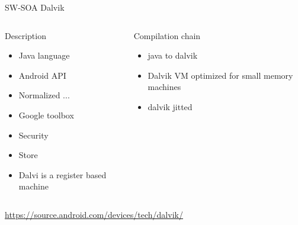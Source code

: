 %
\begin{Frame}{SW-SOA Dalvik}
  \begin{columns}[t]
    \begin{column}{5cm} %
      \begin{block}{Description}
        \begin{itemize}
        \item Java language
        \item Android API
        \item Normalized ...
        \item Google toolbox
        \item Security
        \item Store
        \item Dalvi is a register based machine
        \end{itemize}
      \end{block} 
    \end{column}
    
    \begin{column}{5cm} %
      \begin{block}{Compilation chain}
        \begin{itemize}
        \item java to dalvik
        \item Dalvik VM optimized for small memory machines
        \item dalvik jitted
        \end{itemize}
      \end{block}   
    \end{column}
  \end{columns}  
\url{https://source.android.com/devices/tech/dalvik/}
\end{Frame}


